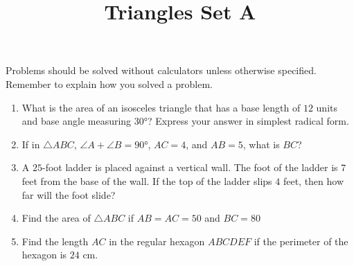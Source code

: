 \documentclass{article}
\title{Triangles Set A}
\date{}
\author{}
\begin{document}
\maketitle
\noindent Problems should be solved without calculators unless otherwise specified.
Remember to explain how you solved a problem.
\begin{multicols}{2}
    \begin{enumerate}
        \item What is the area of an isosceles triangle that has a base length of $12$ units and base angle measuring $\ang{30}$?
            Express your answer in simplest radical form.
            \vspace{3cm}
        \item If in $\triangle ABC$, $\angle A + \angle B = \ang{90}$, $AC = 4$, and $AB = 5$, what is $BC$?
            \vspace{3cm}
        \item A $25$-foot ladder is placed against a vertical wall.
            The foot of the ladder is $7$ feet from the base of the wall.
            If the top of the ladder slips $4$ feet, then how far will the foot slide?
            \vspace{3cm}
        \item Find the area of $\triangle ABC$ if $AB = AC = 50$ and $BC = 80$
            \vspace{3cm}
        \item Find the length $AC$ in the regular hexagon $ABCDEF$ if the perimeter of the hexagon is $24$ cm.
            \vspace{3cm}
    \end{enumerate}
\end{multicols}
\end{document}
